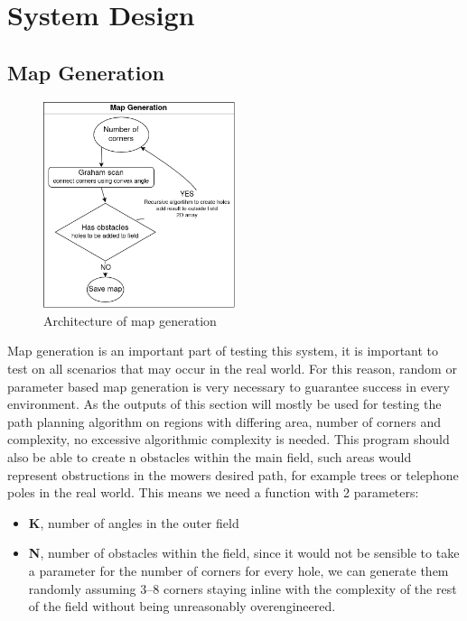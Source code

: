 \documentclass[final]{cmpreport_02}
\begin{document}
\section{System Design}
\subsection{Map Generation}

\begin{figure}[H]
	\centering
	\includegraphics[width=0.5\textwidth]{./images/mapGen.drawio.png}
	\caption{Architecture of map generation}
	\label{MG:arch}
\end{figure}


Map generation is an important part of testing this system, it is important to test on all scenarios that may occur in the real world.
For this reason, random or parameter based map generation is very necessary to guarantee success in every environment.
As the outputs of this section will mostly be used for testing the path planning algorithm on regions with differing area, number of corners and complexity, no excessive algorithmic complexity is needed.
This program should also be able to create n obstacles within the main field, such areas would represent obstructions in the mowers desired path, for example trees or telephone poles in the real world.
This means we need a function with 2 parameters:

\begin{itemize}
	\item \textbf{K}, number of angles in the outer field
	\item \textbf{N}, number of obstacles within the field, since it would not be sensible to take a parameter for the number of corners for every hole, we can generate them randomly assuming 3–8 corners staying inline with the complexity of the rest of the field without being unreasonably overengineered.
\end{itemize}
\end{document}
